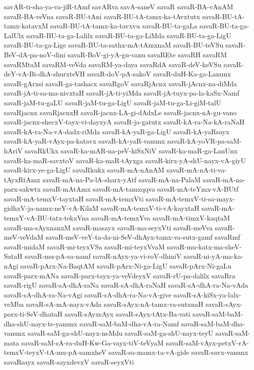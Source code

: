 {savAR-ti-sha-ya-va-jiR-tAmf
savARva
savA-saneV
savaR
savaR-BA-vAnAM
savaR-BA-veVna
savaR-BU-tAni
savaR-BU-tA-tamx-ka-tAvxtutx
savaR-BU-tA-tamx-katavxM
savaR-BU-tA-tamx-ka-tavxvu
savaR-BU-ta-gaLa
savaR-BU-ta-ga-LalUlx
savaR-BU-ta-ga-Lalilx
savaR-BU-ta-ga-LiMda
savaR-BU-ta-ga-LigU
savaR-BU-ta-ga-Lige
savaR-BU-ta-sathx-mA-tAmxnaM
savaR-BU-teVSu
savaR-BeV-dA-pa-noV-dini
savaR-BoV-gi-yA-gu-vanu
savaREte
savaRH
savaRM
savaRMtaM
savaRM-veVda
savaRM-ya-daya
savaRdA
savaR-deV-heVSu
savaR-deY-vA-Bi-dhA-shurxteVH
savaR-doV-pA-sakoV
savaR-duH-Ka-ga-Lanunx
savaR-gArxsi
savaR-ga-tashacx
savaRgoV
savaRjAcnx
savaR-jAcnx-na-diMda
savaR-jA-ti-sa-ma-nivxtaH
savaR-jA-ti-yiMda
savaR-jA-tuyx-pa-la-kaSx-Namf
savaR-jaM-tu-gaLU
savaR-jaM-tu-ga-LigU
savaR-jaM-tu-ga-Li-giM-talU
savaRjacnx
savaRjacnxH
savaR-jacnx-LA-gi-dAdxLe
savaR-jacnx-nA-gu-vano
savaR-jacnx-shecxV-tayx-vi-dayxyA
savaR-ja-gatutx
savaR-kA-ra-Na-kA-raNaH
savaR-kA-ra-Na-vA-dadx-riMda
savaR-kA-yaR-ga-LigU
savaR-kA-yaRsayx
savaR-kA-yaR-vAyx-pa-katavx
savaR-kA-yaR-vanunx
savaR-kA-yoVR-pa-saM-hAriV
savaRkUkx
savaR-ka-mAR-na-peV-kiSxNiV
savaR-ka-maR-ga-LanUnx
savaR-ka-maR-savxtoV
savaR-ka-maR-tAyxga
savaR-kirx-yA-shU-nayx-vA-giyU
savaR-kirx-ye-ga-LigU
savaRkukx
savaR-mA-nAnAM
savaR-mA-nA-ti-va-tAyxRtAmx
savaR-mA-na-Pa-lA-sharx-yAtf
savaR-mA-na-PalaM
savaR-mA-na-parx-sakwtx
savaR-mAtAmx
savaR-mA-tamxqqva
savaR-mA-teYmx-vA-BUtf
savaR-mA-temxV-tayxtaH
savaR-mA-temxVti
savaR-mA-temxV-ti-sa-mayx-gidhxV-ja-namx-neY-vA-KilaM
savaR-mA-temxV-ti-vA-kayxtaH
savaR-mA-temxY-vA-BU-tatx-tekxVna
savaR-mA-temxYva
savaR-mA-timxV-kaqtaM
savaR-ma-sAyxnanxM
savaR-masayx
savaR-ma-seyxVti
savaR-meVva
savaR-meV-veVdaM
savaR-meV-veY-ta-da-ni-SeV-dhAyx-tamx-va-sutx-gamf
savaRmf
savaR-midaM
savaR-mi-teyxVSa
savaR-mi-teyxVvaM
savaR-mu-katx-ma-sheV-SataH
savaR-mu-pA-sa-namf
savaR-nAyx-ya-vi-roV-dhiniV
savaR-ni-yA-ma-ka-nAgi
savaR-pArx-Na-BaqtAM
savaR-pArx-Ni-ga-LigU
savaR-pArx-Ni-gaLu
savaR-parx-mANa
savaR-parx-tayx-ya-veVdeyxV
savaR-rU-pa-dalilx
savaRra
savaR-rigU
savaR-sA-dhA-raNa
savaR-sA-dhA-raNaH
savaR-sA-dhA-ra-Na-vAda
savaR-sA-dhA-ra-Na-vAgi
savaR-sA-dhA-ra-Na-vA-give
savaR-sA-kiSx-ya-lalx-veMba
savaR-sA-mA-nayx-vAda
savaR-sAyx-nA-tamx-va-sutxnaH
savaR-sAyx-parx-ti-SeV-dhataH
savaR-sAyxsAyx
savaR-sAyx-tAtx-Ba-vati
savaR-saM-baM-dha-shU-nayx-te-yanunx
savaR-saM-baM-dha-vA-ra-Namf
savaR-saM-baM-dha-vanunx
savaR-saM-ga-shU-nayx-neMdu
savaR-saM-ga-shU-nayx-teyU
savaR-saM-mata
savaR-saM-sA-ra-duH-Kw-Ga-vayx-tiV-teVyaM
savaR-saM-vAyx-petxV-rA-temxV-teyxV-tA-mu-pA-samxheV
savaR-sa-mamx-ta-vA-gide
savaR-savx-vanunx
savaRsayx
savaR-sayxdevxV
savaR-seyxVti
}
